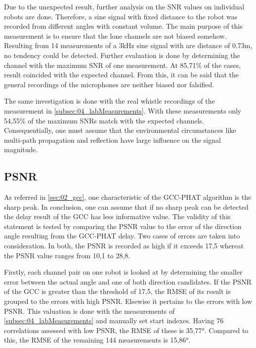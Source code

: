 Due to the unexpected result, further analysis on the \ac{SNR} values
on individual robots are done.
Therefore, a sine signal with fixed distance to the robot
was recorded from different angles with constant volume.
The main purpose of this measurement is to ensure that the lone channels
are not biased somehow.
Resulting from 14 measurements of a 3\si{\kilo\hertz} sine signal
with are distance of 0.73\si{m}, no tendency could be detected.
Further evaluation is done by determining the channel with the maximum
\ac{SNR} of one measurement. At 85,71\si{\percent} of the cases,
result coincided with the expected channel.
From this, it can be said that the general recordings of the microphones
are neither biased nor falsified.

The same investigation is done with the real whistle recordings of the
measurement in \ref{subsec:04_labMeasurements}.
With these measurements only 54,55\si{\percent} of the maximum \acp{SNR}
match with the expected channels.
Consequentially, one must assume that the environmental circumstances
like multi-path propagation and reflection have large influence
on the signal magnitude.

\subsection{PSNR}
\label{subsec:04_psnr}

As referred in \cref{sec:02_gcc}, one characteristic of the \ac{GCC-PHAT}
algorithm is the sharp peak.
In conclusion, one can assume that if no sharp peak can be detected the
delay result of the \ac{GCC} has less informative value.
The validity of this statement is tested by comparing the \ac{PSNR} value
to the error of the direction angle resulting from the \ac{GCC-PHAT} delay.
Two cases of errors are taken into consideration.
In both, the \ac{PSNR} is recorded as high if it exceeds 17,5 whereat the
\ac{PSNR} value ranges from 10,1 to 28,8.

Firstly, each channel pair on one robot is looked at by determining the
smaller error between the actual angle and one of both direction candidates.
If the \ac{PSNR} of the \ac{GCC} is greater than the threshold of 17,5,
the \ac{RMSE} of its result is grouped to the errors with high \ac{PSNR}.
Elsewise it pertains to the errors with low \ac{PSNR}.
This valuation is done with the measurements of \cref{subsec:04_labMeasurements}
and manually set start indexes.
Having 76 correlations assessed with low \ac{PSNR}, the \ac{RMSE} of these
is 35,77\si{\degree}.
Compared to this, the \ac{RMSE} of the remaining 144 measurements
is 15,86\si{\degree}.

